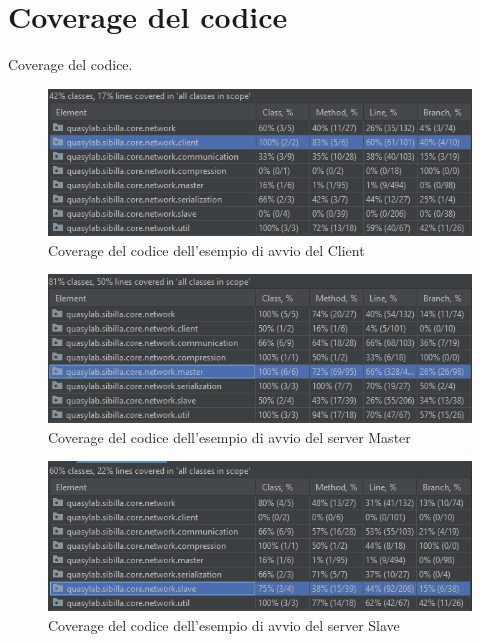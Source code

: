 \section{Coverage del codice}
Coverage del codice.

\begin{figure}[H]
    \includegraphics[width=\linewidth]{images/client_coverage.PNG}
    \captionsetup{justification=centering}
    \caption{Coverage del codice dell'esempio di avvio del Client}
  \end{figure}
  \begin{figure}[H]
    \includegraphics[width=\linewidth]{images/master_coverage.PNG}
    \captionsetup{justification=centering}
    \caption{Coverage del codice dell'esempio di avvio del server Master}
  \end{figure}
  \begin{figure}[H]
    \includegraphics[width=\linewidth]{images/slave_coverage.PNG}
    \captionsetup{justification=centering}
    \caption{Coverage del codice dell'esempio di avvio del server Slave}
  \end{figure}